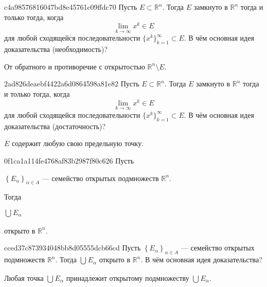 \begin{note}{c4a98576816047bd8e45761c09ffdc70}
    Пусть \({ E \subset \mathbb R^{n} }\).
    Тогда \({ E }\) замкнуто в \({ \mathbb R^{n} }\) тогда и только тогда, когда
    \[
        \lim_{k \to \infty} x^{k} \in E
    \]
    для любой сходящейся последовательности \({ \{ x^{k} \}_{k = 1}^{\infty} \subset E }\).
    В чём основная идея доказательства (необходимость)?

    \begin{cloze}{1}
        От обратного и противоречие с открытостью \({ \mathbb R^{n} \setminus E }\).
    \end{cloze}
\end{note}

\begin{note}{2ad826deaebf4422a6d0864598a81e82}
    Пусть \({ E \subset \mathbb R^{n} }\).
    Тогда \({ E }\) замкнуто в \({ \mathbb R^{n} }\) тогда и только тогда, когда
    \[
        \lim_{k \to \infty} x^{k} \in E
    \]
    для любой сходящейся последовательности \({ \{ x^{k} \}_{k = 1}^{\infty} \subset E }\).
    В чём основная идея доказательства (достаточность)?

    \begin{cloze}{1}
        \({ E }\) содержит любую свою предельную точку.
    \end{cloze}
\end{note}

\begin{note}{0f1ca1a114fe4768af83b2987f80c626}
    Пусть \begin{icloze}{3}\({ \left\{ E_\alpha \right\}_{\alpha \in A} }\) --- семейство открытых подмножеств \({ \mathbb R^{n} }\).\end{icloze}
    Тогда \begin{icloze}{2}\({ \bigcup_{}^{} E_\alpha }\)\end{icloze} \begin{icloze}{1}открыто в \({ \mathbb R^{n} }\).\end{icloze}
\end{note}

\begin{note}{cced37c873934048bb8d05555dcb66cd}
    Пусть \({ \left\{ E_\alpha \right\}_{\alpha \in A} }\) --- семейство открытых подмножеств \({ \mathbb R^{n} }\).
    Тогда \({ \bigcup_{}^{} E_\alpha }\) открыто в \({ \mathbb R^{n} }\).
    В чём основная идея доказательства?

    \begin{cloze}{1}
        Любая точка \({ \bigcup_{}^{} E_\alpha }\) принадлежит открытому подмножеству \({ \bigcup_{}^{} E_\alpha }\).
    \end{cloze}
\end{note}

